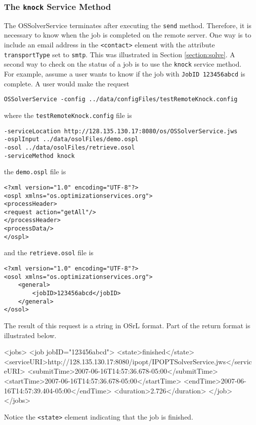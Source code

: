 \documentclass[11pt]{article}
\renewcommand{\_}{{\char"5F}}
\renewcommand{\{}{{\char"7B}}
\renewcommand{\}}{{\char"7D}}
\renewcommand{\^}{{\char"0D}}
\renewcommand{\'}{{\char"0D}}
\begin{document}
\subsubsection{The  {\tt knock} Service Method}\label{section:knock}

The OSSolverService terminates after executing the {\tt send} method. Therefore, it is necessary to know when the job is completed on the remote server. One way is to include an email address in the  {\tt <contact>}  element with the attribute {\tt transportType}     set to {\tt smtp}.  This was illustrated in Section \ref{section:solve}.  A second way to check on the status of a job is to use the {\tt knock} service method.  For example, assume a user   wants to know if  the job with {\tt JobID 123456abcd}  is complete. A user would make the request
\begin{verbatim}
OSSolverService -config ../data/configFiles/testRemoteKnock.config
\end{verbatim}
where the {\tt testRemoteKnock.config} file is
\begin{verbatim}
-serviceLocation http://128.135.130.17:8080/os/OSSolverService.jws
-osplInput ../data/osolFiles/demo.ospl
-osol ../data/osolFiles/retrieve.osol
-serviceMethod knock
\end{verbatim}
the {\tt demo.ospl} file is
\begin{verbatim}
<?xml version="1.0" encoding="UTF-8"?>
<ospl xmlns="os.optimizationservices.org">
<processHeader>
<request action="getAll"/>
</processHeader>
<processData/>
</ospl>
\end{verbatim}
and the {\tt retrieve.osol} file is
\begin{verbatim}
<?xml version="1.0" encoding="UTF-8"?>
<osol xmlns="os.optimizationservices.org">
 	<general>         
 		<jobID>123456abcd</jobID>  
	</general>
</osol>
\end{verbatim}
The result of this request is a string in OSrL format.  Part of the return format is illustrated below.
\begin{verbatimtab}[4]
<jobs>
	<job jobID="123456abcd">
		<state>finished</state>
		<serviceURI>http://128.135.130.17:8080/ipopt/IPOPTSolverService.jws</serviceURI>
		<submitTime>2007-06-16T14:57:36.678-05:00</submitTime>
		<startTime>2007-06-16T14:57:36.678-05:00</startTime>
		<endTime>2007-06-16T14:57:39.404-05:00</endTime>
		<duration>2.726</duration>
 </job>
</jobs>
\end{verbatimtab}
Notice the {\tt <state>} element indicating that the job is finished.   
\end{document}
